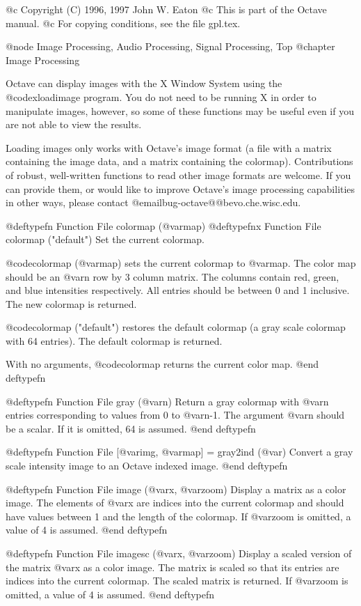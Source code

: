 @c Copyright (C) 1996, 1997 John W. Eaton
@c This is part of the Octave manual.
@c For copying conditions, see the file gpl.tex.

@node Image Processing, Audio Processing, Signal Processing, Top
@chapter Image Processing

Octave can display images with the X Window System using the
@code{xloadimage} program.  You do not need to be running X in order to
manipulate images, however, so some of these functions may be useful
even if you are not able to view the results.

Loading images only works with Octave's image format (a file with a
matrix containing the image data, and a matrix containing the
colormap).  Contributions of robust, well-written functions to read
other image formats are welcome.  If you can provide them, or would like
to improve Octave's image processing capabilities in other ways, please
contact @email{bug-octave@@bevo.che.wisc.edu}.

@deftypefn {Function File} {} colormap (@var{map})
@deftypefnx {Function File} {} colormap ("default")
Set the current colormap.

@code{colormap (@var{map})} sets the current colormap to @var{map}.  The
color map should be an @var{n} row by 3 column matrix.  The columns
contain red, green, and blue intensities respectively.  All entries
should be between 0 and 1 inclusive.  The new colormap is returned.

@code{colormap ("default")} restores the default colormap (a gray scale
colormap with 64 entries).  The default colormap is returned.

With no arguments, @code{colormap} returns the current color map.
@end deftypefn

@deftypefn {Function File} {} gray (@var{n})
Return a gray colormap with @var{n} entries corresponding to values from
0 to @var{n}-1.  The argument @var{n} should be a scalar.  If it is
omitted, 64 is assumed.
@end deftypefn

@deftypefn {Function File} {[@var{img}, @var{map}] =} gray2ind (@var{})
Convert a gray scale intensity image to an Octave indexed image.
@end deftypefn

@deftypefn {Function File} {} image (@var{x}, @var{zoom})
Display a matrix as a color image.  The elements of @var{x} are indices
into the current colormap and should have values between 1 and the
length of the colormap.  If @var{zoom} is omitted, a value of 4 is
assumed. 
@end deftypefn

@deftypefn {Function File} {} imagesc (@var{x}, @var{zoom})
Display a scaled version of the matrix @var{x} as a color image.  The
matrix is scaled so that its entries are indices into the current
colormap.  The scaled matrix is returned.  If @var{zoom} is omitted, a
value of 4 is assumed.
@end deftypefn

